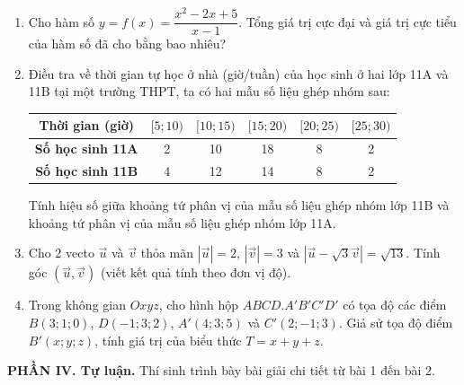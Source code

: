 \documentclass[12pt]{article}
\begin{document}
	\begin{enumerate}[label=\textbf{Câu \arabic*.}, leftmargin=*]
		
		\item Cho hàm số $y = f(x) = \dfrac{x^2 - 2x + 5}{x - 1}$. Tổng giá trị cực đại và giá trị cực tiểu của hàm số đã cho bằng bao nhiêu?
		
		\vspace{2mm}
		\item Điều tra về thời gian tự học ở nhà (giờ/tuần) của học sinh ở hai lớp 11A và 11B tại một trường THPT, ta có hai mẫu số liệu ghép nhóm sau:
		
		\begin{center}
			\renewcommand{\arraystretch}{1.2}
			\begin{tabular}{|c|c|c|c|c|c|}
				\hline
				\textbf{Thời gian (giờ)} & $[5; 10)$ & $[10; 15)$ & $[15; 20)$ & $[20; 25)$ & $[25; 30)$ \\
				\hline
				\textbf{Số học sinh 11A} & 2 & 10 & 18 & 8 & 2 \\
				\hline
				\textbf{Số học sinh 11B} & 4 & 12 & 14 & 8 & 2 \\
				\hline
			\end{tabular}
		\end{center}
		Tính hiệu số giữa khoảng tứ phân vị của mẫu số liệu ghép nhóm lớp 11B và khoảng tứ phân vị của mẫu số liệu ghép nhóm lớp 11A.
		
		\vspace{2mm}
		\item Cho 2 vecto $\vec{u}$ và $\vec{v}$ thỏa mãn $|\vec{u}| = 2$, $|\vec{v}| = 3$ và $|\vec{u} - \sqrt{3}\vec{v}| = \sqrt{13}$. Tính góc $(\vec{u}, \vec{v})$ (viết kết quả tính theo đơn vị độ).
		
		\vspace{2mm}
		\item Trong không gian $Oxyz$, cho hình hộp $ABCD.A'B'C'D'$ có tọa độ các điểm $B(3; 1; 0)$, $D(-1; 3; 2)$, $A'(4; 3; 5)$ và $C'(2; -1; 3)$. Giả sử tọa độ điểm $B'(x; y; z)$, tính giá trị của biểu thức $T = x + y + z$.
		
	\end{enumerate}
	
	
	\vspace{4mm}
	\noindent\textbf{PHẦN IV. Tự luận.} Thí sinh trình bày bài giải chi tiết từ bài 1 đến bài 2.
	\vspace{2mm}
	
\end{document}
